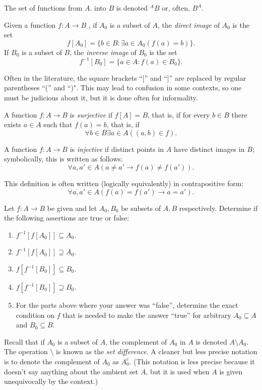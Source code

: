 The set of functions from $A$.
into $B$ is denoted $^AB$ or, often, $B^A$.

Given a function $f:A\to B$ , if $A_0$ is a subset of $A$, the \emph{direct image} of $A_0$ is the set
\[
  f[A_0]=\{b\in B \colon \exists a\in A_0( f(a)=b) \}.
\]
If $B_0$ is a subset of $B$, the \emph{inverse image} of $B_0$ is the set
\[
  f^{-1}[B_0]= \{a\in A \colon f(a)\in B_0\}.
\]

Often in the literature, the square brackets “[”  and “]” are replaced by regular parentheses “(”  and “)".
This may lead to confusion in some contexts, so one must be judicious about it, but it is done often for informality.

A function $f: A\to B$ is \emph{surjective} if $f[A]=B$, that is, if for every $b\in B$ there exists $a\in A$ such that $f(a)=b$, that is, if
\[
  \forall b \in B \exists a\in A ((a,b)\in f).
\]

A function $f: A\to B$ is \emph{injective} if distinct points in $A$ have distinct images in $B$;
symbolically, this is written as follows:
\[
  \forall a, a'\in A  (a \neq a' \to f(a)\neq f(a')).
\]

This definition is often written (logically equivalently) in contrapositive form:
\[
  \forall a, a'\in A  (f(a) = f(a') \to a =a' ).
\]

\begin{exercise}
  Let $f:A\to B$ be given and let $A_0, B_0$ be subsets of $A,B$ respectively.
  Determine if the following assertions are true or false:
  \begin{enumerate}
  \item
    $f^{-1}[f[A_0]]\subseteq A_0$.
  \item
    $f^{-1}[f[A_0]]\supseteq A_0$.
  \item
    $f[f^{-1}[B_0]]\subseteq B_0$.
  \item
    $f[f^{-1}[B_0]]\supseteq B_0$.
  \item[(\theenumi)*]
    For the parts above where your answer was “false”, determine the exact condition on $f$ that is needed to make the answer “true” for arbitrary $A_0\subseteq A$ and $B_0\subseteq B$.
  \end{enumerate}
\end{exercise}

Recall that if $A_0$ is a subset of $A$, the complement of $A_0$ in $A$ is denoted $A\setminus A_0$.
The operation $\setminus$ is known as the \emph{set difference}.
A cleaner but less precise notation is to denote the complement of $A_0$ as $A_0^{c}$.
(This notation is less precise because it doesn’t say anything about the ambient set $A$, but it is used when $A$ is given unequivocally by the context.)


